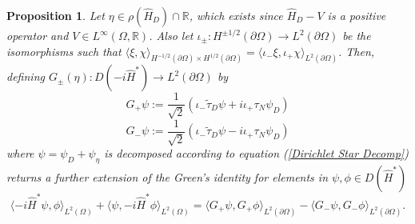\documentclass[10pt,a4paper]{amsart}
\newtheorem{proposition}{Proposition}
\begin{document}
\begin{proposition}\label{Current Decomposition}
        Let $\eta \in \rho(\hat{H}_D)\cap \mathbb{R}$, which exists since $\hat{H}_D-V$ is a positive operator and $V \in L^\infty(\Omega,\mathbb{R})$. Also let $\iota_\pm:H^{\pm {1/2}}(\partial \Omega)\to L^2(\partial \Omega)$ be the isomorphisms such that $\langle \xi,\chi \rangle_{H^{-1/2}(\partial \Omega) \times H^{1/2}(\partial \Omega)}=\langle \iota _- \xi, \iota_+ \chi \rangle_{L^2(\partial \Omega)}$. Then, defining $G_\pm(\eta): D(-i\hat{H}^*)\to L^2(\partial \Omega)$ by
    \begin{equation}
        G_+\psi:=\frac{1}{\sqrt{2}}\left(\iota_- \tilde{\tau}_D \psi  + i \iota_+ \tau_N \psi_D\right)
    \end{equation}
    \begin{equation}
        G_-\psi:=\frac{1}{\sqrt{2}}\left(\iota_-\tilde{\tau}_D \psi  - i \iota_+ \tau_N  \psi_D \right)
    \end{equation}
    where $\psi=\psi_D + \psi_\eta$ is decomposed according to equation (\ref{Dirichlet Star Decomp}) returns a further extension of the Green's identity for elements in $\psi, \phi \in D(\hat{H}^*)$
    \begin{equation}\label{Current Star Decomp Eq}
        \langle -i\hat{H}^* \psi,\phi \rangle_{L^2(\Omega)} + \langle \psi,-i\hat{H}^* \phi \rangle_{L^2(\Omega)}=\langle G_+\psi,G_+\phi \rangle_{L^2(\partial \Omega)} - \langle G_-\psi,G_- \phi \rangle_{L^2(\partial \Omega)}.
    \end{equation}
        \end{proposition}
\end{document}
